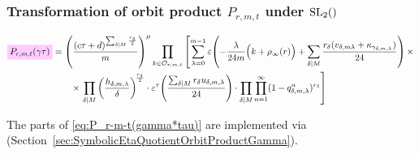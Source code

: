 \documentclass{article}
\begin{document}
\begin{Hemmecke}


\subsubsection{Transformation of orbit product $P_{r,m,t}$ under $\SL2Z$}

\begin{align}
  \defineNotation[P-r-m-t-gamma-tau]{P_{r,m,t}(\gamma\tau)}
  &=
    \left(\frac{(c\tau+d)^{\divisorsum{M} \frac{r_\delta}{2}}}{m}\right)^\mu
    \prod_{k\in \modularOrbit{r,m,t}}
    \left[\sum_{\lambda=0}^{m-1}
    \unityPower{-\frac{\lambda}{24m}\Bigl(k+\rho_\infty(r)\Bigr)
    + \divisorsum{M}\frac{r_\delta(v_{\delta,m\lambda} +
    \kappa_{\gamma_{\delta,m,\lambda}})}{24}} \times\right.\notag\\
  &\qquad\times
    \left.
    \divisorprod{M}
    \left(\frac{h_{\delta,m,\lambda}}{\delta}\right)^{\!\frac{r_\delta}{2}}
    \cdot
    \unityPowerTau{\frac{\divisorsum{M} r_\delta u_{\delta,m,\lambda}}{24}}
    \cdot
    \divisorprod{M} \prod_{n=1}^\infty (1-q_{\delta,m,\lambda}^n)^{r_\delta}
    \right]
    \label{eq:P_r-m-t(gamma*tau)}
\end{align}

The parts of \eqref{eq:P_r-m-t(gamma*tau)} are implemented via
\textcolor{blue}{}
(Section~\ref{sec:SymbolicEtaQuotientOrbitProductGamma}).



\end{Hemmecke}
\end{document}
